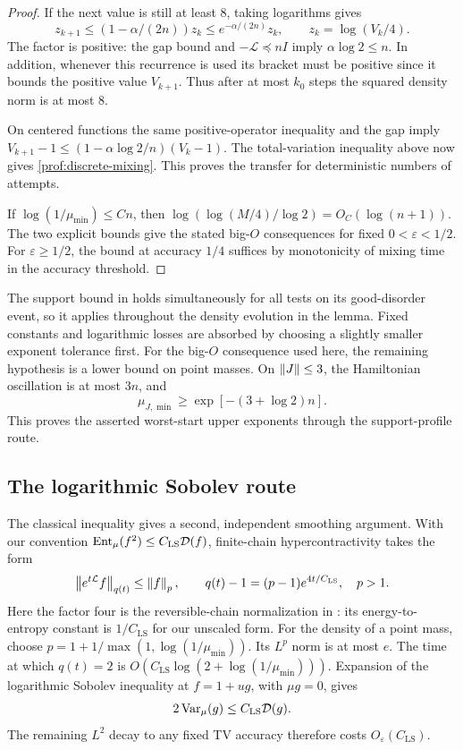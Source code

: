 \begin{proof}
If the next value is still at least $8$, taking logarithms gives
\[
 z_{k+1}\le(1-\alpha/(2n))z_k
          \le e^{-\alpha/(2n)}z_k,
 \qquad z_k=\log(V_k/4).
\]
The factor is positive: the gap bound and $-\mathcal L\preceq nI$ imply
$\alpha\log2\le n$. In addition, whenever this recurrence is used its
bracket must be positive since it bounds the positive value $V_{k+1}$.
Thus after at most $k_0$ steps the squared density norm is at most $8$.

On centered functions the same positive-operator inequality and the gap
imply
$V_{k+1}-1\le(1-\alpha\log2/n)(V_k-1)$.
The total-variation inequality above now gives
\eqref{prof:discrete-mixing}. This proves the transfer for deterministic
numbers of attempts.

If $\log(1/\mu_{\min})\le Cn$, then
$\log(\log(M/4)/\log2)=O_C(\log(n+1))$.
The two explicit bounds give the stated big-$O$ consequences for fixed
$0<\varepsilon<1/2$. For $\varepsilon\ge1/2$, the bound at accuracy $1/4$
suffices by monotonicity of mixing time in the accuracy threshold.
\end{proof}

The support bound in  holds simultaneously
for all tests on its good-disorder event, so it applies throughout the
density evolution in the lemma. Fixed constants and logarithmic losses
are absorbed by choosing a slightly smaller exponent tolerance first.
For the big-$O$ consequence used here, the remaining hypothesis is a lower
bound on point masses. On
$\left\lVert J\right\rVert\le3$, the Hamiltonian oscillation is at most $3n$, and
\begin{equation}\label{eq:minimum-mass}
 \mu_{J,\min}\ge\exp[-(3+\log2)n].
\end{equation}
This proves the asserted worst-start upper exponents through the
support-profile route.

\subsection{The logarithmic Sobolev route}

The classical inequality gives a second, independent smoothing
argument. With our convention
$\operatorname{Ent}_\mu(f^2)\le C_{\mathrm{LS}}\mathcal D(f)$,
finite-chain hypercontractivity takes the form
\begin{equation}\label{eq:hypercontractivity}
 \left\lVert e^{t\mathcal L}f\right\rVert_{q(t)}\le\left\lVert f\right\rVert_p,
 \qquad q(t)-1=(p-1)e^{4t/C_{\mathrm{LS}}},\quad p>1.
\end{equation}
Here the factor four is the reversible-chain normalization in
\cite[Theorem~3.5(ii)]{DSC1996}: its energy-to-entropy constant is
$1/C_{\mathrm{LS}}$ for our unscaled form.
For the density of a point mass, choose
$p=1+1/\max(1,\log(1/\mu_{\min}))$. Its $L^p$ norm is at most $e$.
The time at which $q(t)=2$ is
$O(C_{\mathrm{LS}}\log(2+\log(1/\mu_{\min})))$.
Expansion of the logarithmic Sobolev inequality at $f=1+u g$, with
$\mu g=0$, gives
\begin{equation}\label{eq:lsi-poincare}
 2\operatorname{Var}_\mu(g)\le C_{\mathrm{LS}}\mathcal D(g).
\end{equation}
The remaining $L^2$ decay to any fixed TV accuracy therefore costs
$O_\varepsilon(C_{\mathrm{LS}})$.

